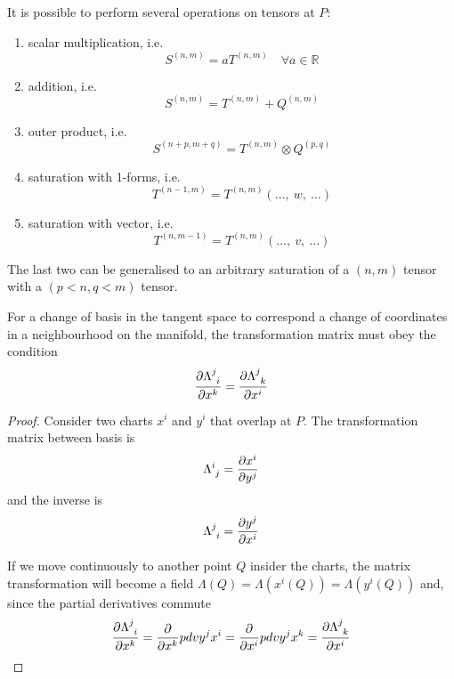     It is possible to perform several operations on tensors at $P$:
    \begin{enumerate}
        \item scalar multiplication, i.e. 
            \begin{equation*}
                S^{(n,m)} = a T^{(n,m)} \quad \forall a \in \mathbb R
            \end{equation*}
        \item addition, i.e. 
            \begin{equation*}
                S^{(n,m)} = T^{(n,m)} + Q^{(n,m)}
            \end{equation*}
        \item outer product, i.e. 
            \begin{equation*}
                S^{(n+p,m+q)} = T^{(n,m)} \otimes Q^{(p,q)}
            \end{equation*}
        \item saturation with 1-forms, i.e. 
            \begin{equation*}
                T^{(n-1,m)} = T^{(n,m)} (\ldots, ~w, ~\ldots)
            \end{equation*}
        \item saturation with vector, i.e. 
            \begin{equation*}
                T^{(n,m-1)} = T^{(n,m)} (\ldots, ~v, ~\ldots)
            \end{equation*}
    \end{enumerate}
    The last two can be generalised to an arbitrary saturation of a $(n,m)$ tensor with a $(p<n, q<m)$ tensor. 

    For a change of basis in the tangent space to correspond a change of coordinates in a neighbourhood on the manifold, the transformation matrix must obey the condition
    \begin{equation}\label{proof8}
        \pdv{\Lambda^j_{\phantom j i}}{x^k} = \pdv{\Lambda^j_{\phantom j k}}{x^i}
    \end{equation}

    \begin{proof}
        Consider two charts $x^i$ and $y^i$ that overlap at $P$. The transformation matrix between basis is 
        \begin{equation*}
            \Lambda^i_{\phantom i j} = \pdv{x^i}{y^j}
        \end{equation*}
        and the inverse is 
        \begin{equation*}
            \Lambda^j_{\phantom j i} = \pdv{y^j}{x^i}
        \end{equation*}

        If we move continuously to another point $Q$ insider the charts, the matrix transformation will become a field $\Lambda(Q) = \Lambda(x^i(Q)) = \Lambda(y^i(Q))$ and, since the partial derivatives commute
        \begin{equation*}
            \pdv{\Lambda^j_{\phantom j i}}{x^k} = \pdv{}{x^k} pdv{y^j}{x^i} = \pdv{}{x^i} pdv{y^j}{x^k} = \pdv{\Lambda^j_{\phantom j k}}{x^i}
        \end{equation*}
    \end{proof}

